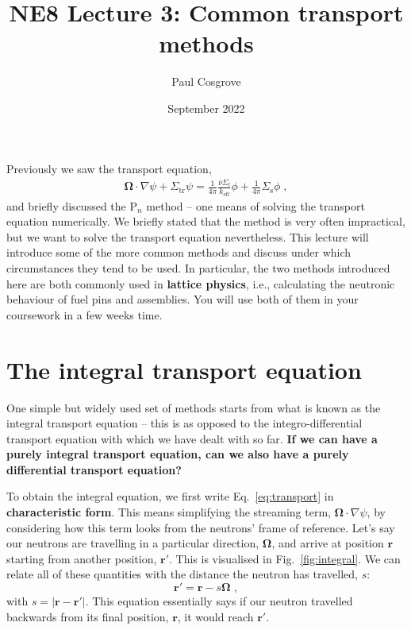 \documentclass{article}
\title{NE8 Lecture 3: Common transport methods}
\author{Paul Cosgrove}
\date{September 2022}
\begin{document}
\maketitle

Previously we saw the transport equation,
\begin{equation}\label{eq:transport}
    \begin{split}
 \mathbf{\Omega}\cdot\nabla\psi + \Sigma_\mathrm{tr}\psi
    =\frac{1}{4\pi}\frac{\bar{\nu}\Sigma_\mathrm{f}}{ k_\mathrm{eff}}\phi + \frac{1}{4\pi}\Sigma_\mathrm{s}\phi\;\mathrm{,}
    \end{split}
\end{equation}
and briefly discussed the P$_n$ method -- one means of solving the transport equation numerically. We briefly stated that the method is very often impractical, but we want to solve the transport equation nevertheless. This lecture will introduce some of the more common methods and discuss under which circumstances they tend to be used. In particular, the two methods introduced here are both commonly used in \textbf{lattice physics}, i.e., calculating the neutronic behaviour of fuel pins and assemblies. You will use both of them in your coursework in a few weeks time.

\section{The integral transport equation}

One simple but widely used set of methods starts from what is known as the integral transport equation -- this is as opposed to the integro-differential transport equation with which we have dealt with so far. \textbf{If we can have a purely integral transport equation, can we also have a purely differential transport equation?}

To obtain the integral equation, we first write Eq.~\eqref{eq:transport} in \textbf{characteristic form}. This means simplifying the streaming term, $\mathbf{\Omega}\cdot\nabla\psi$, by considering how this term looks from the neutrons' frame of reference. Let's say our neutrons are travelling in a particular direction, $\mathbf{\Omega}$, and arrive at position $\mathbf{r}$ starting from another position, $\mathbf{r}'$. This is visualised in Fig.~\ref{fig:integral}. We can relate all of these quantities with the distance the neutron has travelled, $s$:
\begin{equation}
    \mathbf{r}'=\mathbf{r} - s\mathbf{\Omega}\;\mathrm{,}
\end{equation}
with $s = |\mathbf{r}-\mathbf{r}'|$. This equation essentially says if our neutron travelled backwards from its final position, $\mathbf{r}$, it would reach $\mathbf{r}'$.
\end{document}
